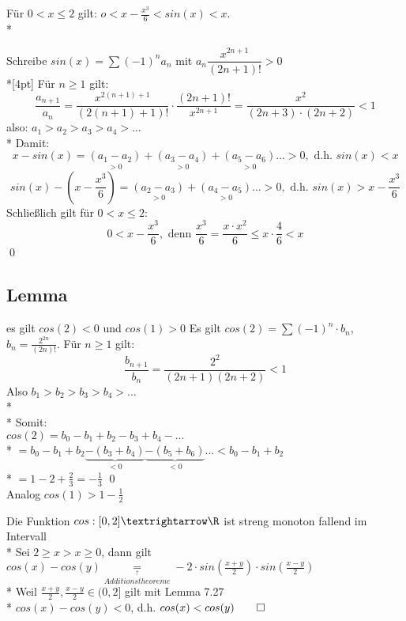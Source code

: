 

Für $0<x\leq 2$ gilt: $o<x-\frac{x^3}{6}<sin(x)<x$.\\*

\bew
Schreibe $sin(x)=\sum(-1)^na_n$ mit $a_n\dfrac{x^{2n+1}}{(2n+1)!}>0$\\*[4pt]
Für $n\geq 1$ gilt: $$\frac{a_{n+1}}{a_n}=\dfrac{x^{2(n+1)+1}}{(2(n+1)+1)!}·\dfrac{(2n+1)!}{x^{2n+1}}=\frac{x^2}{(2n+3)·(2n+2)}<1$$
also: $a_1>a_2>a_3>a_4>…$\\*
Damit: $$x-sin(x)=\underset{>0}{(a_1-a_2)}+\underset{>0}{(a_3-a_4)}+\underset{>0}{(a_5-a_6)}…>0,\text{ d.h. $sin(x)<x$}$$
$$sin(x)-(x-\frac{x^3}{6})=\underset{>0}{(a_2-a_3)}+\underset{>0}{(a_4-a_5)}…>0,\text{ d.h. $sin(x)>x-\frac{x^3}{6}$}$$
Schließlich gilt für $0<x\leq 2$:
$$0<x-\frac{x^3}{6}, \text{ denn } \frac{x^3}{6}=\frac{x·x^2}{6}\leq x·\frac{4}{6}<x$$ \qed

\subsection*{Lemma} es gilt $cos(2) < 0$ und $cos(1) > 0$
\bew
	Es gilt $cos(2) = \sum (-1)^n \cdot b_n$, $b_n = \frac{2^{2n}}{(2n)!}$. Für $n \geq 1$ gilt: 
	$$\frac{b_{n+1}}{b_n} = \frac{2^2}{(2n+1)(2n+2)} < 1$$
	Also $b_1 > b_2 > b_3 > b_4 >...$ \\*
	\\*
	Somit:\\
	$cos(2) = b_0 - b_1 + b_2 - b_3 + b_4 - ...$\\*
	$= b_0 - b_1 + b_2 \underbrace{-(b_3 + b_4)}_{<0} \underbrace{-(b_5 + b_6)}_{< 0}... < b_0 - b_1 + b_2$ \\*
	$= 1 - 2 + \frac{2}{3} = - \frac{1}{3}$ \qed\\
	Analog $cos(1) > 1-\frac{1}{2}$

Die Funktion $cos:[0,2]→\R$ ist streng monoton fallend im Intervall\\*
\bew
Sei $2\geq x>x\geq 0$, dann gilt $cos(x)-cos(y)\underset{\overset{\uparrow}{Additionstheoreme}}{=}-2·sin(\frac{x+y}{2})·sin(\frac{x-y}{2})$\\*
Weil $\frac{x+y}{2}, \frac{x-y}{2}\in (0,2]$ gilt mit Lemma 7.27\\*
$cos(x)-cos(y)<0$, d.h. $cos(x)<cos(y)\qed$

